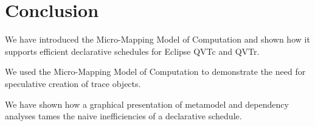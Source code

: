 \documentclass[conference]{IEEEtran}
\begin{document}
%






\section{Conclusion}\label{Conclusions}

We have introduced the Micro-Mapping Model of Computation and shown how it supports efficient declarative schedules for Eclipse QVTc and QVTr.

We used the Micro-Mapping Model of Computation to demonstrate the need for speculative creation of trace objects.

We have shown how a graphical presentation of metamodel and dependency analyses tames the naive inefficiencies of a declarative schedule.
\end{document}
